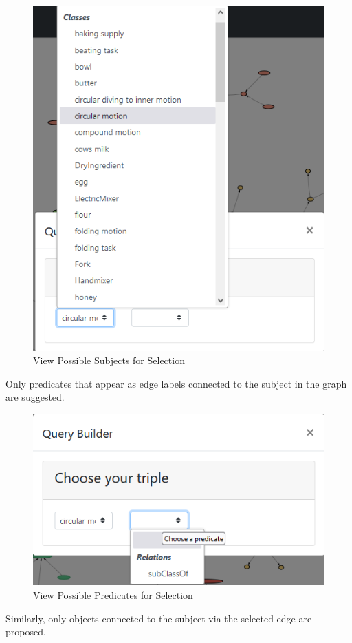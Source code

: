 \begin{figure}[H]
    \includegraphics[scale=0.4]{Graphics/OwlVisualizer/queryBuilder1.png}
    \centering
    \caption{View Possible Subjects for Selection}
\end{figure}

Only predicates that appear as edge labels connected to the subject in the graph are suggested. 

\begin{figure}[H]
    \includegraphics[scale=0.4]{Graphics/OwlVisualizer/queryBuilder2.png}
    \centering
    \caption{View Possible Predicates for Selection}
\end{figure}
Similarly, only objects connected to the subject via the selected edge are proposed. 

